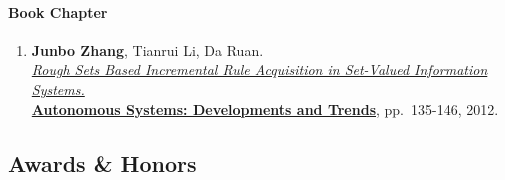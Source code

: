 \documentclass[10pt,a4paper]{article}
\begin{document}
\paragraph{Book Chapter}\label{book-chapter}

\begin{enumerate}
\def\labelenumi{\arabic{enumi}.}
\itemsep1pt\parskip0pt
\item
  \textbf{Junbo Zhang}, Tianrui Li, Da Ruan.\\
  \href{http://dx.doi.org/10.1007/978-3-642-24806-1_11}{\emph{Rough Sets
  Based Incremental Rule Acquisition in Set-Valued Information
  Systems.}}\\
  \href{http://www.springer.com/engineering/computational+intelligence+and+complexity/book/978-3-642-24805-4}{\textbf{Autonomous
  Systems: Developments and Trends}}, pp.~135-146, 2012.
\end{enumerate}

\subsection{Awards \& Honors}\label{awards-honors}
\end{document}
